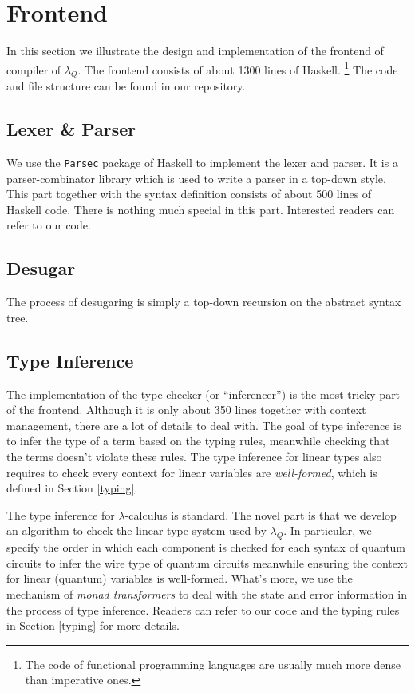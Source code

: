 \section{Frontend}\label{front}
In this section we illustrate the design and implementation of the frontend of compiler of $\lambda_Q$.
The frontend consists of about 1300 lines of Haskell.
\footnote{The code of functional programming languages are usually much more dense than imperative ones.}
The code and file structure can be found in our repository.

\subsection{Lexer \& Parser}
We use the \texttt{Parsec} package of Haskell to implement the lexer and parser.
It is a parser-combinator library which is used to write a parser in a top-down style.
This part together with the syntax definition consists of about 500 lines of Haskell code.
There is nothing much special in this part. Interested readers can refer to our code.

\subsection{Desugar}
The process of desugaring is simply a top-down recursion on the abstract syntax tree.

\subsection{Type Inference}
The implementation of the type checker (or ``inferencer'') is the most tricky part of the frontend.
Although it is only about 350 lines together with context management, there are a lot of details to deal with.
The goal of type inference is to infer the type of a term based on the typing rules, meanwhile checking that the terms doesn't violate these rules.
The type inference for linear types also requires to check every context for linear variables are \textit{well-formed}, which is defined in Section \ref{typing}.

The type inference for $\lambda$-calculus is standard.
The novel part is that we develop an algorithm to check the linear type system used by $\lambda_Q$.
In particular, we specify the order in which each component is checked for each syntax of quantum circuits to infer the wire type of quantum circuits meanwhile ensuring the context for linear (quantum) variables is well-formed.
What's more, we use the mechanism of \textit{monad transformers} to deal with the state and error information in the process of type inference.
Readers can refer to our code and the typing rules in Section \ref{typing} for more details.

